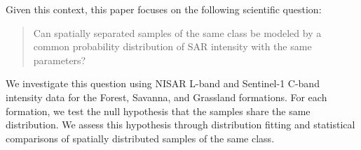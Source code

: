 Given this context, this paper focuses on the following scientific question: 
\begin{quote}
Can spatially separated samples of the same class be modeled by a common probability distribution of SAR intensity with the same parameters?
\end{quote}
We investigate this question using NISAR L-band and Sentinel-1 C-band intensity data for the Forest, Savanna, and Grassland formations.
For each formation, we test the null hypothesis that the samples share the same distribution.
We assess this hypothesis through distribution fitting and statistical comparisons of spatially distributed samples of the same class.